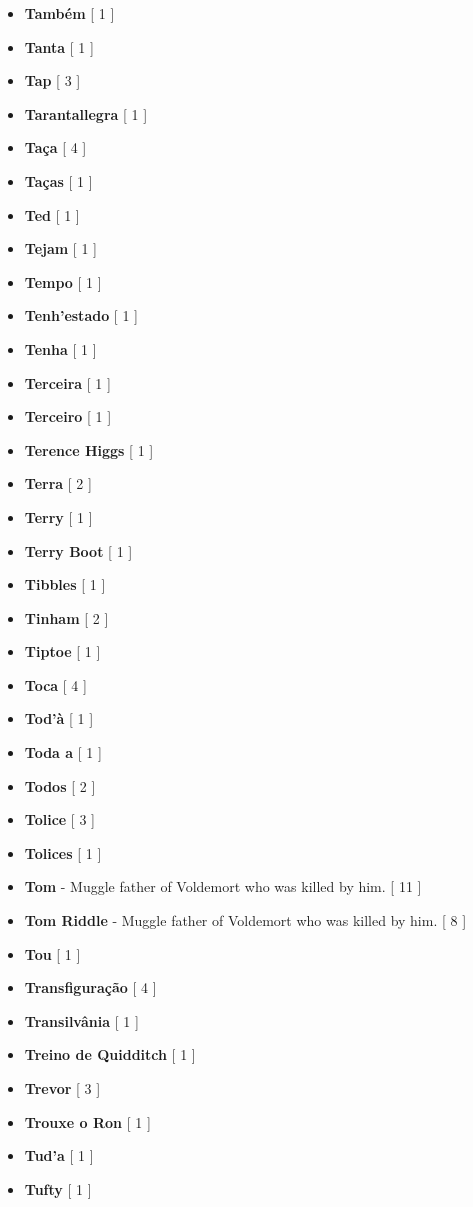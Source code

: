 \documentclass[a4paper]{article}
\begin{document}
\begin{itemize}
	\item \textbf{Também} [ 1 ]
	\item \textbf{Tanta} [ 1 ]
	\item \textbf{Tap} [ 3 ]
	\item \textbf{Tarantallegra} [ 1 ]
	\item \textbf{Taça} [ 4 ]
	\item \textbf{Taças} [ 1 ]
	\item \textbf{Ted} [ 1 ]
	\item \textbf{Tejam} [ 1 ]
	\item \textbf{Tempo} [ 1 ]
	\item \textbf{Tenh'estado} [ 1 ]
	\item \textbf{Tenha} [ 1 ]
	\item \textbf{Terceira} [ 1 ]
	\item \textbf{Terceiro} [ 1 ]
	\item \textbf{Terence Higgs} [ 1 ]
	\item \textbf{Terra} [ 2 ]
	\item \textbf{Terry} [ 1 ]
	\item \textbf{Terry Boot} [ 1 ]
	\item \textbf{Tibbles} [ 1 ]
	\item \textbf{Tinham} [ 2 ]
	\item \textbf{Tiptoe} [ 1 ]
	\item \textbf{Toca} [ 4 ]
	\item \textbf{Tod'à} [ 1 ]
	\item \textbf{Toda a} [ 1 ]
	\item \textbf{Todos} [ 2 ]
	\item \textbf{Tolice} [ 3 ]
	\item \textbf{Tolices} [ 1 ]
	\item \textbf{Tom} - Muggle father of Voldemort who was killed by him. [ 11 ]
	\item \textbf{Tom Riddle} - Muggle father of Voldemort who was killed by him. [ 8 ]
	\item \textbf{Tou} [ 1 ]
	\item \textbf{Transfiguração} [ 4 ]
	\item \textbf{Transilvânia} [ 1 ]
	\item \textbf{Treino de Quidditch} [ 1 ]
	\item \textbf{Trevor} [ 3 ]
	\item \textbf{Trouxe o Ron} [ 1 ]
	\item \textbf{Tud'a} [ 1 ]
	\item \textbf{Tufty} [ 1 ]

\end{itemize}
\end{document}
